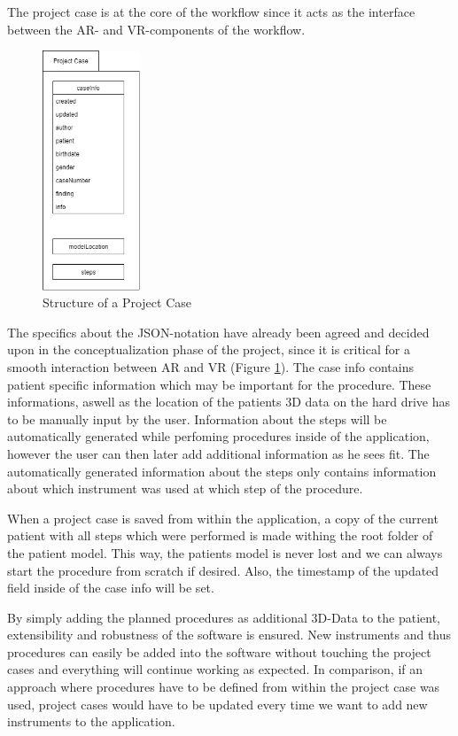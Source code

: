 The project case is at the core of the workflow since it acts as the interface between the AR- and VR-components of the workflow.

\begin{figure}[ht]
    \centering
    \includegraphics[width=110px]{images/implementation/project_case.png}
    \caption{\label{fig::ImplementationProjectCase}Structure of a Project Case}
\end{figure}

The specifics about the JSON-notation have already been agreed and decided upon in the conceptualization phase of the project, since it is critical for a smooth interaction between AR and VR (Figure \ref{fig::ImplementationProjectCase}). 
The case info contains patient specific information which may be important for the procedure.
These informations, aswell as the location of the patients 3D data on the hard drive has to be manually input by the user.
Information about the steps will be automatically generated while perfoming procedures inside of the application, however the user can then later add additional information as he sees fit.
The automatically generated information about the steps only contains information about which instrument was used at which step of the procedure.

When a project case is saved from within the application, a copy of the current patient with all steps which were performed is made withing the root folder of the patient model.
This way, the patients model is never lost and we can always start the procedure from scratch if desired.
Also, the timestamp of the updated field inside of the case info will be set.

By simply adding the planned procedures as additional 3D-Data to the patient, extensibility and robustness of the software is ensured.
New instruments and thus procedures can easily be added into the software without touching the project cases and everything will continue working as expected.
In comparison, if an approach where procedures have to be defined from within the project case was used, project cases would have to be updated every time we want to add new instruments to the application.